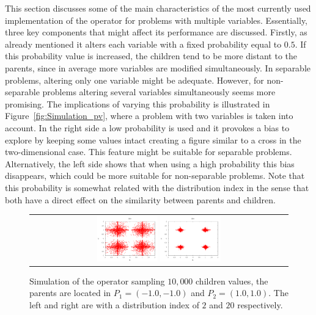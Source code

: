 This section discusses some of the main characteristics of the most currently used implementation of the \SBX{} operator for problems with multiple variables.
%
Essentially, three key components that might affect its performance are discussed.
%
Firstly, as already mentioned it alters each variable with a fixed probability equal to $0.5$.
%
If this probability value is increased, the children tend to be more distant to the parents, since in average 
more variables are modified simultaneously.
%
In separable problems, altering only one variable might be adequate.
%
However, for non-separable problems altering several variables simultaneously seems more promising.
%
The implications of varying this probability is illustrated in Figure~\ref{fig:Simulation_pv}, where a problem
with two variables is taken into account.
%
In the right side a low probability is used and it provokes a bias to explore by keeping some values intact
creating a figure similar to a cross in the two-dimensional case.
%
This feature might be suitable for separable problems.
%
Alternatively, the left side shows that when using a high probability this bias disappears, which could be 
more suitable for non-separable problems.
%
Note that this probability is somewhat related with the distribution index in the sense that both have a
direct effect on the similarity between parents and children.
%
%
\begin{figure}[t]
\centering
\begin{tabular}{c}
   \includegraphics[width=0.24\textwidth]{img/Operadores/SBX_eta_2.png}  %
   \includegraphics[width=0.24\textwidth]{img/Operadores/SBX_eta_20.png} 
\end{tabular}
\caption{Simulation of the \SBX{} operator sampling $10,000$ children values, the parents are located in $P_1=(-1.0, -1.0)$ and $P_2=(1.0, 1.0)$. The left and right are with a distribution index of $2$ and $20$ respectively.}
\label{fig:Simulation_Case_3}
\end{figure}

